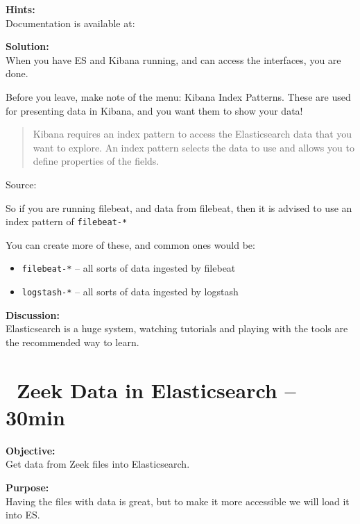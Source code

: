 \documentclass[a4paper,11pt,notitlepage]{report}
\begin{document}
{\bf Hints:}\\
Documentation is available at:\\

{\bf Solution:}\\
When you have ES and Kibana running, and can access the interfaces, you are done.

Before you leave, make note of the menu: Kibana Index Patterns. These are used for presenting data in Kibana, and you want them to show your data!

\begin{quote}
Kibana requires an index pattern to access the Elasticsearch data that you want to explore. An index pattern selects the data to use and allows you to define properties of the fields.
\end{quote}
Source: 

So if you are running filebeat, and data from filebeat, then it is advised to use an index pattern of \verb+filebeat-*+


You can create more of these, and common ones would be:
\begin{itemize}
\item \verb+filebeat-*+ -- all sorts of data ingested by filebeat
\item \verb+logstash-*+ -- all sorts of data ingested by logstash

\end{itemize}

{\bf Discussion:}\\
Elasticsearch is a huge system, watching tutorials and playing with the tools are the recommended way to learn.



\chapter{\faExclamationTriangle\ Zeek Data in Elasticsearch -- 30min}
\label{ex:zeek-json-es}

{\bf Objective:}\\
Get data from Zeek files into Elasticsearch.


{\bf Purpose:}\\
Having the files with data is great, but to make it more accessible we will load it into ES.
\end{document}
